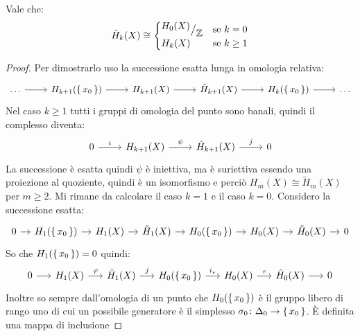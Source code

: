 \begin{proposition}
  Vale che:
  \[
    \tilde{H}_k(X) \cong
    \begin{cases}
      {^{\textstyle H_0(X)}\big/_{\textstyle \mathbb{Z}}} & \text{se } k = 0 \\
      H_k(X) & \text{se } k \geq 1
    \end{cases}
  \]
\end{proposition}
\begin{proof}
  Per dimostrarlo uso la successione esatta lunga in omologia relativa:
  \[
    \begin{tikzcd}
      \dots \arrow{r}{} & H_{k+1}(\set{x_0}) \arrow{r}{} & H_{k+1}(X) \arrow{r}{} & \tilde{H}_{k+1}(X) \arrow{r}{} & H_k(\set{x_0}) \arrow{r}{} & \dots
    \end{tikzcd}
  \]
  Nel caso $ k \geq 1 $ tutti i gruppi di omologia del punto sono banali, quindi il complesso diventa:
  \[
    \begin{tikzcd}
      0 \arrow{r}{i} & H_{k+1}(X) \arrow{r}{\psi} &  \tilde{H}_{k+1}(X) \arrow{r}{j} &  0
    \end{tikzcd}
  \]
  La successione è esatta quindi $ \psi $ è iniettiva, ma è suriettiva essendo una
  proiezione al quoziente, quindi è un isomorfismo e perciò $ H_m(X) \cong \tilde{H}_m(X) $ per $ m \geq 2 $.
  Mi rimane da calcolare il caso $ k = 1 $ e il caso $ k = 0 $.
  Considero la successione esatta:
  \[
    \begin{tikzcd}[nodes = {column sep = 10pt}]
      0 \rar & H_1(\set{x_0}) \rar & H_1(X) \rar & \tilde{H}_1(X) \rar & H_0(\set{x_0}) \rar & H_0(X) \rar & \tilde{H}_0(X) \rar & 0
    \end{tikzcd}
  \]
  So che $ H_1(\set{x_0}) = 0 $ quindi:
  \[
    \begin{tikzcd}[nodes = {column sep = 15pt}]
      0 \rar & H_1(X) \rar{\phi} & \tilde{H}_1(X) \rar{j} & H_0(\set{x_0}) \rar{i_\star} & H_0(X) \rar{\tau} & \tilde{H}_0(X) \rar & 0
    \end{tikzcd}
  \]
  Inoltre so sempre dall'omologia di un punto che $ H_0(\set{x_0}) $ è il gruppo
  libero di rango uno di cui un possibile generatore è il simplesso
  $ \sigma_0 \colon \Delta_0 \to \set{x_0} $. È definita una mappa di inclusione

\end{proof}

